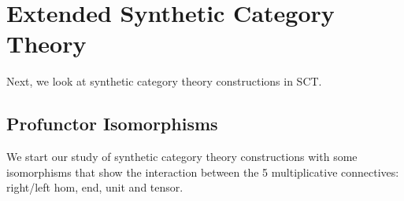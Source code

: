 



\section{Extended Synthetic Category Theory}

Next, we look at synthetic category theory constructions in SCT.

\subsection{Profunctor Isomorphisms}

We start our study of synthetic category theory constructions with
some isomorphisms that show the interaction between the 5
multiplicative connectives: right/left hom, end, unit and tensor.

